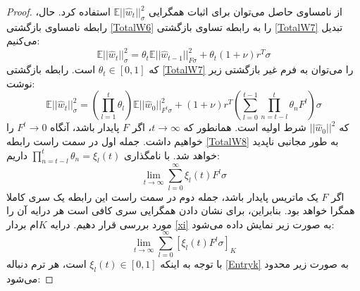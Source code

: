 \begin{proof}
	از نامساوی حاصل می‌توان برای اثبات همگرایی $\mathbb{E}||\hat{w}_t||^2_{\sigma}$ استفاده کرد. حال، رابطه نامساوی بازگشتی \ref{TotalW6} را به رابطه تساوی بازگشتی \ref{TotalW7} تبدیل می‌کنیم:
	\begin{equation}\label{TotalW7}
		\mathbb{E}||\hat{w}_t||^2_{\sigma} = \theta_t\mathbb{E}||\hat{w}_{t-1}||^2_{F\sigma}+\theta_t(1+\nu)r^T \sigma
	\end{equation}
	که $\theta_t\in[0,1]$ است. رابطه بازگشتی \ref{TotalW7} را می‌توان به فرم غیر بازگشتی زیر نوشت:
	\begin{equation}\label{TotalW8}
		\mathbb{E}||\hat{w}_t||^2_{\sigma} =(\prod_{l=1}^{t}  \theta_l)\mathbb{E}||\hat{w}_0||^2_{F^t\sigma}+(1+\nu)r^T(\sum_{l=0}^{t-1}\prod_{n=t-l}^{t}\theta_n F^l) \sigma
	\end{equation}
	که $||\hat{w}_0||^2$ شرط اولیه است. همانطور که $t\rightarrow \infty$، اگر $F$ پایدار باشد، آنگاه $F^t\rightarrow 0$ را خواهیم داشت. جمله اول در سمت راست رابطه  \ref{TotalW8} به طور مجانبی ناپدید خواهد شد. با نامگذاری $\prod_{n=t-l}^{t}\theta_n=\xi_l(t)$ داریم:
	\begin{equation}\label{xi}
		\lim_{t\rightarrow\infty}\sum_{l=0}^{\infty}\xi_l(t) F^l \sigma
	\end{equation}
	اگر $F$ یک ماتریس پایدار باشد، جمله دوم در سمت راست این رابطه یک سری کاملا همگرا خواهد بود. بنابراین، برای نشان دادن همگرایی سری کافی است هر درایه آن را مورد بررسی قرار دهیم. درایه $K$ام بردار \ref{xi} به صورت زیر نمایش داده می‌شود:
	\begin{equation}\label{Entryk}
		\lim_{t\rightarrow\infty}\sum_{l=0}^{\infty}[\xi_l(t) F^l \sigma]_K
	\end{equation}
	با توجه به اینکه $\xi_l(t)\in [0,1]$ است، هر ترم دنباله \ref{Entryk} به صورت زیر محدود می‌شود:
	

\end{proof}
